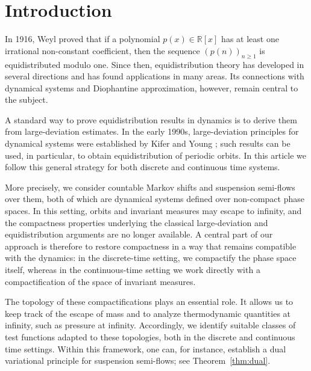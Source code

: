\documentclass[letterpaper,11pt]{amsart}
\numberwithin{equation}{section}     %
\def\ge{\geqslant}
\begin{document}
\maketitle


\section{Introduction}


In 1916, Weyl \cite{we} proved that if a polynomial $p(x) \in \mathbb{R}[x]$ has at least one irrational non-constant coefficient, then the sequence $(p(n))_{n\ge 1}$ is equidistributed modulo one. Since then, equidistribution theory has developed in several directions and has found applications in many areas. Its connections with dynamical systems and Diophantine approximation, however, remain central to the subject.



A standard way to prove equidistribution results in dynamics is to derive them from large-deviation estimates. In the early 1990s, large-deviation principles for dynamical systems were established by Kifer \cite{kif} and Young \cite{y}; such results can be used, in particular, to obtain equidistribution of periodic orbits. In this article we follow this general strategy for both discrete  and continuous time systems.



More precisely, we consider countable Markov shifts and suspension semi-flows over them, both of which are dynamical systems defined over non-compact phase spaces. In this setting, orbits and invariant measures may escape to infinity, and the compactness properties underlying the classical large-deviation and equidistribution arguments are no longer available. A central part of our approach is therefore to restore compactness in a way that remains compatible with the dynamics: in the discrete-time setting, we compactify the phase space itself, whereas in the continuous-time setting we work directly with a compactification of the space of invariant measures.

The topology of these compactifications plays an essential role. It allows us to keep track of the escape of mass and to analyze thermodynamic quantities at infinity, such as pressure at infinity. Accordingly, we identify suitable classes of test functions adapted to these topologies, both in the discrete   and continuous time settings. Within this framework, one can, for instance, establish a dual variational principle for suspension semi-flows; see Theorem~\ref{thm:dual}.
\end{document}
